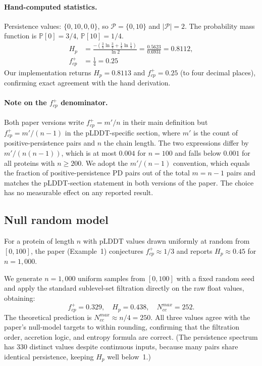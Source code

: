 \paragraph{Hand-computed statistics.}
Persistence values: $\{0, 10, 0, 0\}$, so $\mathcal{P} = \{0, 10\}$
and $|\mathcal{P}| = 2$.
The probability mass function is $\mathbb{P}[0] = 3/4$,
$\mathbb{P}[10] = 1/4$.
\begin{align*}
  H_p &= \frac{-\!\left(\tfrac{3}{4}\ln\tfrac{3}{4} +
                         \tfrac{1}{4}\ln\tfrac{1}{4}\right)}{\ln 2}
       = \frac{0.5623}{0.6931} = 0.8112, \\
  f^+_{cp} &= \tfrac{1}{4} = 0.25
\end{align*}
Our implementation returns $H_p = 0.8113$ and $f^+_{cp} = 0.25$
(to four decimal places), confirming exact agreement with the hand
derivation.

\paragraph{Note on the $f^+_{cp}$ denominator.}
Both paper versions write $f^+_{cp} = m'/n$ in their main definition
but $f^+_{cp} = m'/(n-1)$ in the pLDDT-specific section, where $m'$
is the count of positive-persistence pairs and $n$ the chain length.
The two expressions differ by $m'/(n(n-1))$, which is at most $0.004$
for $n = 100$ and falls below $0.001$ for all proteins with $n \geq 200$.
We adopt the $m'/(n-1)$ convention, which equals the fraction of
positive-persistence PD pairs out of the total $m = n-1$ pairs and
matches the pLDDT-section statement in both versions of the paper.
The choice has no measurable effect on any reported result.

\subsection{Null random model}

For a protein of length $n$ with pLDDT values drawn uniformly at random
from $[0,100]$, the paper (Example~1) conjectures $f^+_{cp} \approx 1/3$
and reports $H_p \approx 0.45$ for $n = 1{,}000$.

We generate $n = 1{,}000$ uniform samples from $[0,100]$ with a fixed
random seed and apply the standard sublevel-set filtration directly on
the raw float values, obtaining:
\[
  f^+_{cp} = 0.329, \quad H_p = 0.438, \quad N_{cc}^{max} = 252.
\]
The theoretical prediction is $N_{cc}^{max} \approx n/4 = 250$.
All three values agree with the paper's null-model targets to within
rounding, confirming that the filtration order, accretion logic, and
entropy formula are correct.
(The persistence spectrum has 330 distinct values despite continuous inputs,
because many pairs share identical persistence, keeping $H_p$ well below~1.)

